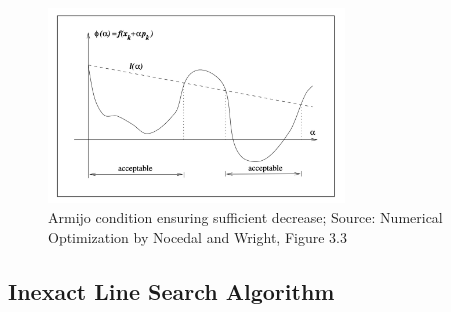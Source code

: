 \documentclass{article}
\begin{document}
\begin{figure}
    \centering
    \includegraphics[width=0.7\textwidth]{plots/armijo_condition.png}
    \caption{Armijo condition ensuring sufficient decrease;
        Source: Numerical Optimization by Nocedal and Wright,
        Figure 3.3
    }
    \label{fig:armijo_condition}
\end{figure}


\subsection{Inexact Line Search Algorithm}

\end{document}
